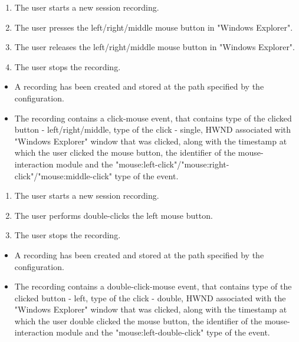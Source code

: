\begin{tests}
	{\begin{enumerate}
		\item The user starts a new session recording.
		\item The user presses the left/right/middle mouse button in "Windows Explorer".
		\item The user releases the left/right/middle mouse button in "Windows Explorer".
		\item The user stops the recording.
	\end{enumerate}}
	{\begin{itemize}
		\item A recording has been created and stored at the path specified by the configuration.
		\item The recording contains a click-mouse event, that contains type of the clicked button - left/right/middle, type of the click - single, HWND associated with "Windows Explorer" window that was clicked, along with the timestamp at which the user clicked the mouse button, the identifier of the mouse-interaction module and the "mouse:left-click"/"mouse:right-click"/"mouse:middle-click" type of the event.
	\end{itemize}}
	
	{\begin{enumerate}
		\item The user starts a new session recording.
		\item The \gls{user} performs double-clicks the left mouse button.
		\item The user stops the recording.
	\end{enumerate}}
	{\begin{itemize}
		\item A recording has been created and stored at the path specified by the configuration.
		\item The recording contains a double-click-mouse event, that contains type of the clicked button - left, type of the click - double, HWND associated with the "Windows Explorer" window that was clicked, along with the timestamp at which the user double clicked the mouse button, the identifier of the mouse-interaction module and the "mouse:left-double-click" type of the event.
	\end{itemize}}
	

\end{tests}
